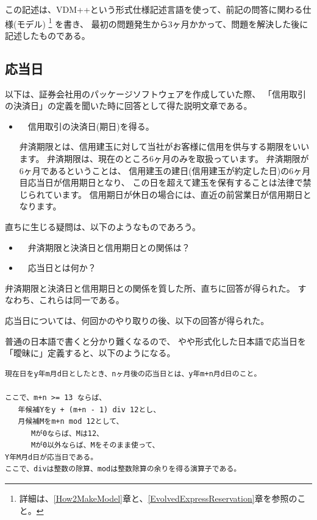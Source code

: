 この記述は、VDM++という形式仕様記述言語を使って、前記の問答に関わる仕様(モデル)
\footnote{詳細は、\ref{How2MakeModel}章と、\ref{EvolvedExpressReservation}章を参照のこと。}
を書き、
最初の問題発生から3ヶ月かかって、問題を解決した後に記述したものである。


\subsection {応当日}

以下は、証券会社用のパッケージソフトウェアを作成していた際、
「信用取引の決済日」の定義を聞いた時に回答として得た説明文章である。

\begin{itemize}
	\item　信用取引の決済日(期日)を得る。

	弁済期限とは、信用建玉に対して当社がお客様に信用を供与する期限をいいます。
	弁済期限は、現在のところ6ヶ月のみを取扱っています。
	弁済期限が6ヶ月であるということは、
	信用建玉の建日(信用建玉が約定した日)の6ヶ月目応当日が信用期日となり、
	この日を超えて建玉を保有することは法律で禁じられています。
	信用期日が休日の場合には、直近の前営業日が信用期日となります。
\end{itemize} 

直ちに生じる疑問は、以下のようなものであろう。

\begin{itemize}
	\item　弁済期限と決済日と信用期日との関係は？
	\item　応当日とは何か？
\end{itemize} 

弁済期限と決済日と信用期日との関係を質した所、直ちに回答が得られた。
すなわち、これらは同一である。

応当日については、何回かのやり取りの後、以下の回答が得られた。

普通の日本語で書くと分かり難くなるので、
やや形式化した日本語で応当日を「曖昧に」定義すると、以下のようになる。

\begin{verbatim}
現在日をy年m月d日としたとき、nヶ月後の応当日とは、y年m+n月d日のこと。

ここで、m+n >= 13 ならば、
   年候補Yをy + (m+n - 1) div 12とし、
   月候補Mをm+n mod 12として、
      Mが0ならば、Mは12、
      Mが0以外ならば、Mをそのまま使って、
Y年M月d日が応当日である。
ここで、divは整数の除算、modは整数除算の余りを得る演算子である。
\end{verbatim}

